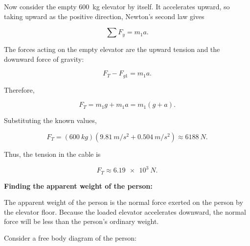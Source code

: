 \begin{mdframed}[backgroundcolor=blue!10!white]
			Now consider the empty \SI{600}{kg} elevator by itself. It accelerates upward, so taking upward as the positive direction, Newton's second law gives
			
			\begin{equation*}
				\sum F_y = m_1a.
			\end{equation*}
			
			The forces acting on the empty elevator are the upward tension and the downward force of gravity:
			
			\begin{equation*}
				F_T-F_{g1}=m_1a.
			\end{equation*}
			
			Therefore,
			
			\begin{equation*}
				F_T = m_1g+m_1a
				= m_1(g+a).
			\end{equation*}
			
			Substituting the known values,
			
			\begin{equation*}
				F_T =
				(\SI{600}{kg})
				\left(\SI{9.81}{m/s^2}+\SI{0.504}{m/s^2}\right)
				\approx \SI{6188}{N}.
			\end{equation*}
			
			Thus, the tension in the cable is
			
			\begin{equation*}
				\boxed{F_T \approx \SI{6.19e3}{N}}.
			\end{equation*}
			
			\vspace{0.1in}
			
			\textbf{Finding the apparent weight of the person:}
			
			The apparent weight of the person is the normal force exerted on the person by the elevator floor. Because the loaded elevator accelerates downward, the normal force will be less than the person's ordinary weight.
			
			Consider a free body diagram of the person:
			
			\begin{center}
\end{center}
\end{mdframed}
